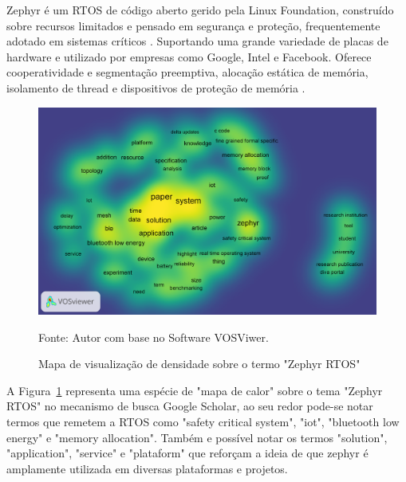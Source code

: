 Zephyr é um RTOS de código aberto gerido pela Linux Foundation, construído sobre recursos
limitados e pensado em segurança e proteção, frequentemente adotado em sistemas críticos \cite{Zhao}.
Suportando uma grande variedade de placas de hardware e utilizado por empresas como Google, Intel
e Facebook. Oferece cooperatividade e segmentação preemptiva, alocação estática de memória,
isolamento de thread e dispositivos de proteção de memória \cite{nyffenegger2020connecting}.

\begin{figure}[H]
	\centering
	\includegraphics[width=15cm]{imagens/Zephyr_RTOS_Density_Visualization.png}
	\caption{Mapa de visualização de densidade sobre o termo "Zephyr RTOS"}
	Fonte: Autor com base no Software VOSViwer.
	\label{fig: Zephyr Density Visualization}
\end{figure}

A Figura~\ref{fig: Zephyr Density Visualization} representa uma espécie de "mapa de calor" sobre o 
tema "Zephyr RTOS" no mecanismo de busca Google Scholar, ao seu redor pode-se notar termos que 
remetem a RTOS como "safety critical system", "iot", "bluetooth low energy" e "memory allocation". 
Também e possível notar os termos "solution", "application", "service" e "plataform" que reforçam a 
ideia de que zephyr é amplamente utilizada em diversas plataformas e projetos\cite{nyffenegger2020connecting}.

